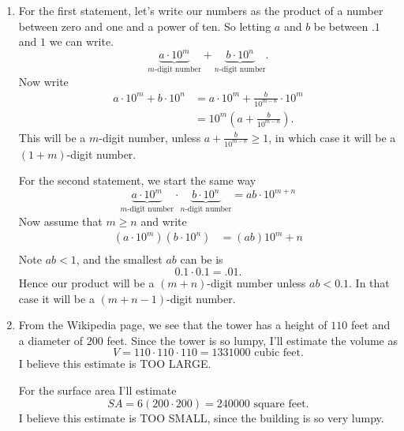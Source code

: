 \documentclass[nooutcomes,noauthor,hints]{ximera}
\begin{document}
\begin{question}
  \begin{freeResponse}
    \begin{enumerate}
    \item For the first statement, let's write our numbers as the
      product of a number between zero and one and a power of ten. So
      letting $a$ and $b$ be between $.1$ and $1$ we can write.
      \[
      \underbrace{a\cdot 10^m}_{\text{$m$-digit number}} + \underbrace{b\cdot 10^n}_{\text{$n$-digit number}}.
      \]
      Now write
      \begin{align*}
        a\cdot 10^m + b\cdot 10^n &= a\cdot 10^m + \frac{b}{10^{m-n}}\cdot 10^m \\
        &= 10^m \left(a +\frac{b}{10^{m-n}}\right).
      \end{align*}
      This will be a $m$-digit number, unless $a+\frac{b}{10^{m-n}}\ge 1$, in
      which case it will be a $(1+m)$-digit number.


      For the second statement, we start the same way
      \[
      \underbrace{a\cdot 10^m}_{\text{$m$-digit number}} \cdot \underbrace{b\cdot 10^n}_{\text{$n$-digit number}} = ab\cdot 10^{m+n}
      \]
      Now assume that $m\ge n$ and write
      \begin{align*}
        \left(a\cdot 10^m\right) \left(b\cdot 10^n\right)  &= (ab)10^m+n\\
      \end{align*}
      Note $ab<1$, and the smallest $ab$ can be is
      \[
      0.1\cdot 0.1 = .01.
      \]
      Hence our product will be a $(m+n)$-digit number unless $ab <
      0.1$. In that case it will be a $(m+n-1)$-digit number.
    \item From the Wikipedia page, we see that the tower has a height
      of $110$ feet and a diameter of $200$ feet. Since the tower is so lumpy, I'll estimate the volume as
      \[
      V = 110\cdot 110\cdot 110 = 1331000 \text{ cubic feet}.
      \]
      I believe this estimate is TOO LARGE.

      For the surface area I'll estimate
      \[
      SA = 6(200\cdot 200) = 240000\text{ square feet}.
      \]
      I believe this estimate is TOO SMALL, since the building is so very
      lumpy.
    \end{enumerate}
  \end{freeResponse}
\end{question}
\end{document}
